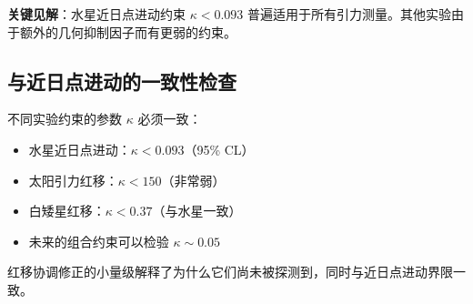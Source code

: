 \documentclass[11pt,a4paper]{article}
\begin{document}
	\textbf{关键见解}：水星近日点进动约束 $\kappa < 0.093$ 普遍适用于所有引力测量。其他实验由于额外的几何抑制因子而有更弱的约束。
	
	\subsection{与近日点进动的一致性检查}
	
	不同实验约束的参数 $\kappa$ 必须一致：
	\begin{itemize}
		\item 水星近日点进动：$\kappa < 0.093$（95\% CL）
		\item 太阳引力红移：$\kappa < 150$（非常弱）
		\item 白矮星红移：$\kappa < 0.37$（与水星一致）
		\item 未来的组合约束可以检验 $\kappa \sim 0.05$
	\end{itemize}
	
	红移协调修正的小量级解释了为什么它们尚未被探测到，同时与近日点进动界限一致。
	
\end{document}
